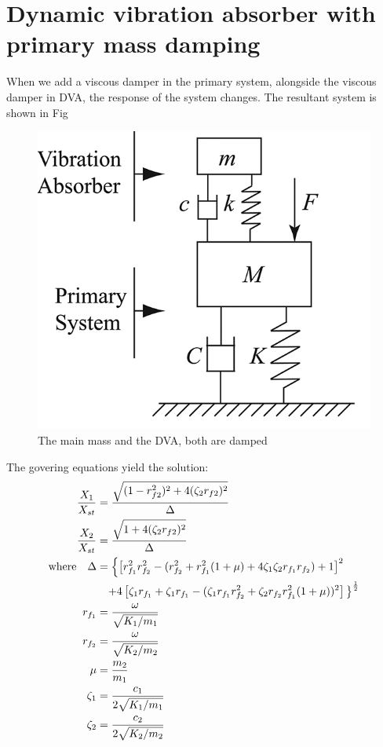\section{Dynamic vibration absorber with primary mass damping}
When we add a viscous damper in the primary system, alongside the viscous damper in DVA,  the response of the system changes. The resultant system is shown in Fig
\begin{figure}[h]
\centering
\includegraphics[scale=0.5]{"figures/withPrimaryMassDamping"}
\caption{The main mass and the DVA, both are damped}
\label{damped}
\end{figure}


The govering equations yield the solution: \\
\begin{align*}
\dfrac{X_1}{X_{st}} &= \dfrac{\sqrt{(1-r_{f2}^2)^2 + 4(\zeta_2 r_{f2})^2}}{\Delta} \\
\dfrac{X_2}{X_{st}} &= \dfrac{\sqrt{\strut 1 + 4(\zeta_2 r_{f2})^2}}{\Delta} \\
\text{where}\quad \Delta &= 
\left\lbrace
\left[
r_{f_1}^2 r_{f_2}^2 - 
( r_{f_2}^2 + r_{f_1}^2 
(1 + \mu)
+ 4 \zeta_1 \zeta_2 r_{f_1} r_{f_2} 
) 
 + 1
\right] ^2 \right.\\
&\phantom{=} \left. + 4 
\left[
 \zeta_1 r_{f_1} + \zeta_1 r_{f_1} -
 (
 \zeta_1 r_{f_1} r_{f_2}^2 + \zeta_2 r_{f_2} r_{f_1}^2 
 (1+\mu)
)^2
\right]
\strut \right\rbrace^\frac{1}{2} \\
r_{f_1} &= \frac{\omega}{\sqrt{K_1 / m_1}}\\
r_{f_2} &= \frac{\omega}{\sqrt{K_2 / m_2}}\\
\mu &= \frac{m_2}{m_1} \\
\zeta_1 &= \frac{c_1}{2\sqrt{K_1/m_1}} \\
\zeta_2 &= \frac{c_2}{2\sqrt{K_2/m_2}}
\end{align*}

